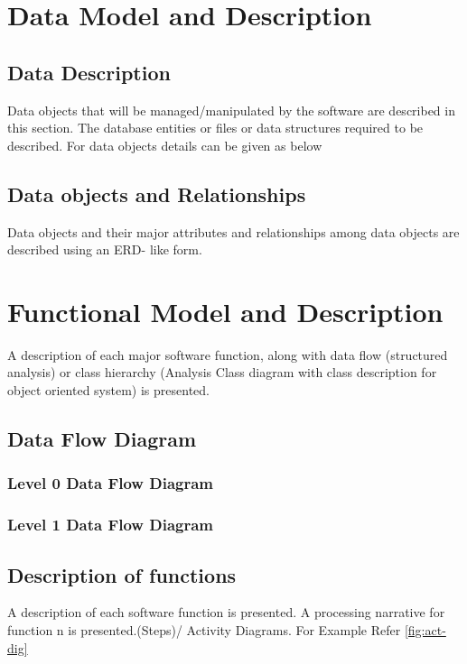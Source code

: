 \documentclass[oneside,a4paper,12pt]{report}
\begin{document}
\begin{table}[!htbp]
\section{Data Model and Description}
\subsection{Data Description}
Data objects that will be managed/manipulated by the software are described in this section. The database entities or files or data structures  required to be described. For data objects details can be given as below
\subsection{Data objects and Relationships}
  Data objects and their major attributes and relationships among data objects are described using an ERD- like form.



\section{Functional Model and Description}
A description of each major software function, along with data flow (structured analysis) or class hierarchy (Analysis Class diagram with class description for object oriented system) is presented.
\subsection{Data Flow Diagram}
\subsubsection{Level 0 Data Flow Diagram}
\subsubsection{Level 1 Data Flow Diagram}

\subsection{Description of functions}
A description of each software function is presented. A processing narrative for function n is presented.(Steps)/ Activity Diagrams. For Example Refer \ref{fig:act-dig}




\end{table}
\end{document}
